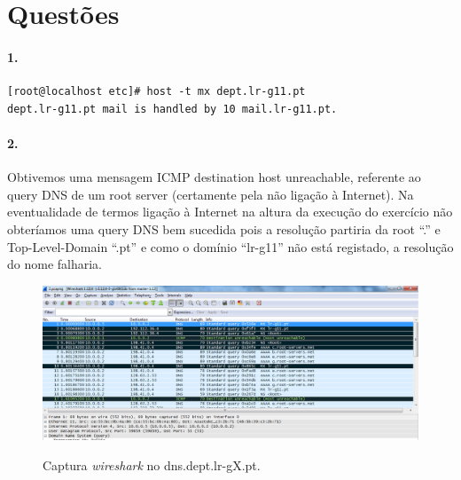 \section*{Questões}
\paragraph{1.}

\begin{verbatim}
[root@localhost etc]# host -t mx dept.lr-g11.pt
dept.lr-g11.pt mail is handled by 10 mail.lr-g11.pt.
\end{verbatim}


\paragraph{2.}
Obtivemos uma mensagem ICMP destination host unreachable, referente ao
query DNS de um root server (certamente pela não ligação à
Internet). Na eventualidade de termos ligação à Internet na altura da
execução do exercício não obteríamos uma query DNS bem sucedida pois a
resolução partiria da root ``.'' e Top-Level-Domain ``.pt'' e como o domínio
``lr-g11'' não está registado, a resolução do nome falharia.

\begin{figure}[h]
\centering
\includegraphics[width=1\textwidth, height=0.33\textheight]{2_cap.png}
\label{fig:2-capturaWireshark}
\caption{Captura \emph{wireshark} no \textsf{dns.dept.lr-gX.pt}.}
\end{figure}












